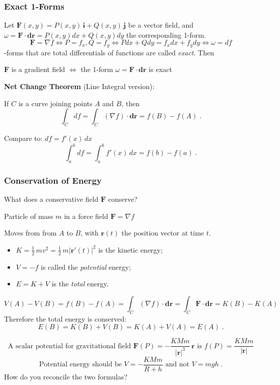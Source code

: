 \begin{frame}
  \frametitle{Exact 1-Forms}

  Let $\textbf{F}(x,y) = P(x,y) \, \textbf{i} + Q(x,y)\, \textbf{j}$ be a vector field, and $\omega = \textbf{F} \cdot \textbf{dr} = P(x,y) dx + Q(x,y) dy$ the corresponding 1-form. \pause
%
$$\textbf{F} = \nabla f \Longleftrightarrow P=f_x, Q=f_y \Longleftrightarrow Pdx + Qdy = f_xdx+f_ydy \Longleftrightarrow \omega = df$$
%
-forms that are total differentials of functions are called \emph{exact}. Then
%
\begin{center}
  $\textbf{F}$ is a gradient field $\Longleftrightarrow$ the 1-form $\omega = \textbf{F} \cdot \textbf{dr}$ is exact
\end{center}

\pause
\textbf{Net Change Theorem} (Line Integral version):

If $C$ is a curve joining points $A$ and $B$, then
%
$$\int_C df = \int_C (\nabla f) \cdot \textbf{dr} = f(B) - f(A)\; .$$

\pause Compare to: $df = f'(x)\, dx$
%
$$\int_a^b df = \int_a^b f'(x)\, dx = f(b)-f(a)\; .$$
\end{frame}

\begin{frame}
  \frametitle{Conservation of Energy}

  What does a conservative field $\textbf{F}$ conserve?

  \pause Particle of mass $m$ in a force field $\textbf{F} = \nabla f$

  \pause Moves from from $A$ to $B$, with $\textbf{r}(t)$ the position vector at time $t$.

  \begin{itemize}
    \item \pause $K = \frac{1}{2}\, mv^2 = \frac{1}{2}\, m|\textbf{r}'(t)|^2$ is the kinetic energy;
    \item \pause $V=-f$ is called the \emph{potential} energy;
    \item \pause $E=K+V$ is the
\emph{total} energy.
  \end{itemize}
  $$V(A)-V(B) = f(B) - f(A) = \int_C (\nabla f) \cdot \textbf{dr} = \int_C \textbf{F} \cdot \textbf{dr} = K(B)-K(A)$$
  \pause Therefore the total energy is conserved:
  $$E(B) = K(B)+V(B) = K(A)+V(A) = E(A)\; .$$

\pause
%
$$\text{A scalar potential for gravitational field } \textbf{F}(P) = -\frac{KMm}{|\textbf{r}|^3}\, \textbf{r} \text{ is } f(P) = \frac{KMm}{|\textbf{r}|}  $$
%
$$\text{Potential energy should be } V = -\frac{KMm}{R+h} \text{ and not } V = mgh\; .$$
\pause How do you reconcile the two formulas?
\end{frame}

